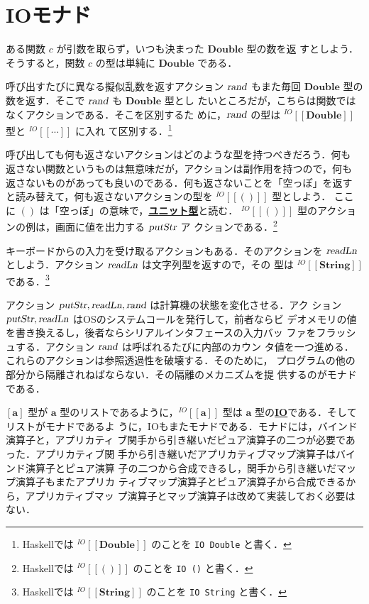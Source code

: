 \documentclass[a5paper,twoside,fleqn]{jsbook}
\def\[{\left[\!\left[}
\def\]{\right]\!\right]}
\newcommand{\programminglanguage}[1]{\textsf{#1}}
\newcommand{\haskell}{\programminglanguage{Haskell}}
\newcommand{\keyword}[1]{{\underline{\textbf{#1}}}}
\newcommand{\code}[1]{\texttt{#1}}
\newcommand{\mAction}[1]{\textsl{#1}}
\DeclareMathOperator{\mReadLn}{\mAction{readLn}}
\DeclareMathOperator{\mPutStr}{\mAction{putStr}}
\DeclareMathOperator{\mRand}{\mAction{rand}}
\newcommand{\mType}[1]{\mathbf{#1}}
\newcommand{\mDoubleType}{\mType{Double}}
\newcommand{\mStringType}{\mType{String}}
\newcommand{\mUnitType}{\mType{()}}
\newcommand{\mListType}[1]{[\mType{#1}]}
\newcommand{\mGenericTypeAssemble}[2]{{}^{\mTypeConstructor{#1}}\[\mType{#2}\]}
\newcommand{\mIOType}[1]{\mGenericTypeAssemble{IO}{#1}}
\newcommand{\mIODoubleType}{\mIOType{\mDoubleType}}
\newcommand{\mIOStringType}{\mIOType{\mStringType}}
\newcommand{\mIOUnitType}{\mIOType{\mUnitType}}
\newcommand{\mTypeConstructor}[1]{\textit{#1}}
\begin{document}
\section{IOモナド}

ある関数 $c$ が引数を取らず，いつも決まった $\mDoubleType$ 型の数を返
すとしよう．そうすると，関数 $c$ の型は単純に $\mDoubleType$ である．

呼び出すたびに異なる擬似乱数を返すアクション $\mRand$ もまた毎回
$\mDoubleType$ 型の数を返す．そこで $\mRand$ も $\mDoubleType$ 型とし
たいところだが，こちらは関数ではなくアクションである．そこを区別するた
めに，$\mRand$ の型は $\mIODoubleType$ 型と $\mIOType{\dotsb}$ に入れ
て区別する．\footnote{\haskell では $\mIODoubleType$ のことを \code{IO
Double} と書く．}

呼び出しても何も返さないアクションはどのような型を持つべきだろう．何も
返さない関数というものは無意味だが，アクションは副作用を持つので，何も
返さないものがあっても良いのである．何も返さないことを「空っぽ」を返す
と読み替えて，何も返さないアクションの型を $\mIOUnitType$ 型としよう．
ここに $\mUnitType$ は「空っぽ」の意味で，\keyword{ユニット型}と読む．
$\mIOUnitType$ 型のアクションの例は，画面に値を出力する $\mPutStr$ ア
クションである．\footnote{\haskell では $\mIOUnitType$ のことを
  \code{IO ()} と書く．}

キーボードからの入力を受け取るアクションもある．そのアクションを
$\mReadLn$ としよう．アクション $\mReadLn$ は文字列型を返すので，その
型は $\mIOStringType$ である．\footnote{\haskell では $\mIOStringType$
のことを \code{IO String} と書く．}

アクション $\mPutStr,\mReadLn,\mRand$ は計算機の状態を変化させる．アク
ション $\mPutStr,\mReadLn$ はOSのシステムコールを発行して，前者ならビ
デオメモリの値を書き換えるし，後者ならシリアルインタフェースの入力バッ
ファをフラッシュする．アクション $\mRand$ は呼ばれるたびに内部のカウン
タ値を一つ進める．これらのアクションは参照透過性を破壊する．そのために，
プログラムの他の部分から隔離されねばならない．その隔離のメカニズムを提
供するのがモナドである．

$\mListType{a}$ 型が $\mType{a}$ 型のリストであるように，$\mIOType{a}$
型は $\mType{a}$ 型の\keyword{IO}である．そしてリストがモナドであるよ
うに，IOもまたモナドである．モナドには，バインド演算子と，アプリカティ
ブ関手から引き継いだピュア演算子の二つが必要であった．アプリカティブ関
手から引き継いだアプリカティブマップ演算子はバインド演算子とピュア演算
子の二つから合成できるし，関手から引き継いだマップ演算子もまたアプリカ
ティブマップ演算子とピュア演算子から合成できるから，アプリカティブマッ
プ演算子とマップ演算子は改めて実装しておく必要はない．
\end{document}
